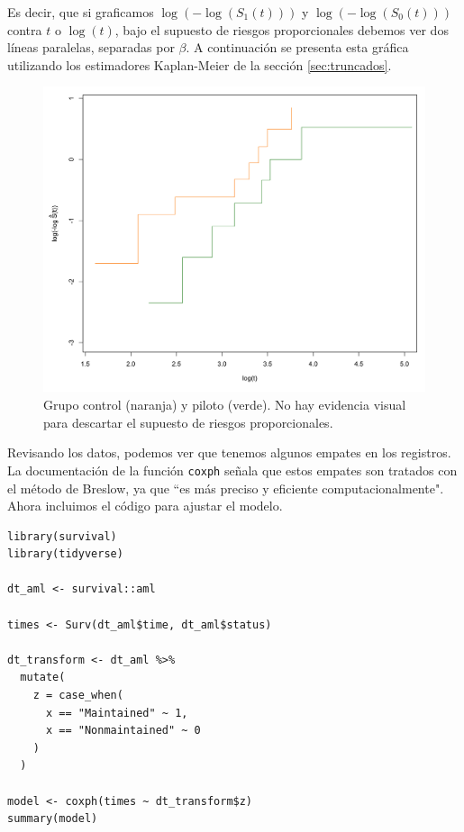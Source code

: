 \documentclass[11pt,a4paper]{article}
\begin{document}
Es decir, que si graficamos $\log (-\log (S_1(t)))$ y $\log (-\log (S_0(t)))$ contra $t$ o $\log (t)$, bajo el supuesto de riesgos proporcionales debemos ver dos líneas paralelas, separadas por $\beta$. A continuación se presenta esta gráfica utilizando los estimadores Kaplan-Meier de la sección \ref{sec:truncados}.\\

\begin{figure}[H] 
\centering\includegraphics[width=12cm]{prop_haz_km.png}
\caption{Grupo control (naranja) y piloto (verde). No hay evidencia visual para descartar el supuesto de riesgos proporcionales.}
\label{fig:coxph}
\end{figure}

Revisando los datos, podemos ver que tenemos algunos empates en los registros. La documentación de la función \texttt{coxph} señala que estos empates son tratados con el método de Breslow, ya que ``es más preciso y eficiente computacionalmente". Ahora incluimos el código para ajustar el modelo.\\

\begin{lstlisting}
library(survival)
library(tidyverse)

dt_aml <- survival::aml

times <- Surv(dt_aml$time, dt_aml$status)

dt_transform <- dt_aml %>%
  mutate(
    z = case_when(
      x == "Maintained" ~ 1,
      x == "Nonmaintained" ~ 0
    )
  )

model <- coxph(times ~ dt_transform$z)
summary(model)
\end{lstlisting}\leavevmode\newline
\end{document}

